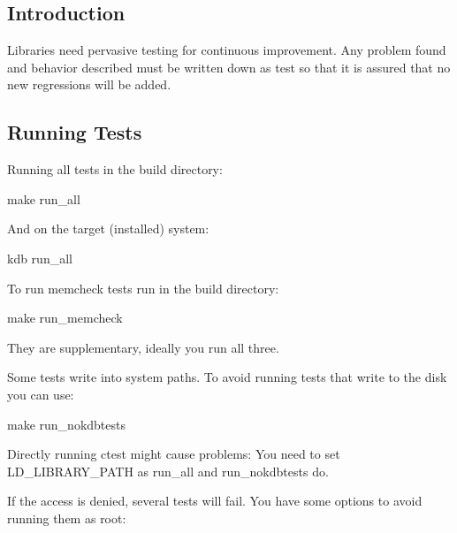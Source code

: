 \subsection*{Introduction}

Libraries need pervasive testing for continuous improvement. Any problem found and behavior described must be written down as test so that it is assured that no new regressions will be added.

\subsection*{Running Tests}

Running all tests in the build directory\+: \begin{DoxyVerb}make run_all
\end{DoxyVerb}


And on the target (installed) system\+: \begin{DoxyVerb}kdb run_all
\end{DoxyVerb}


To run {\ttfamily memcheck} tests run in the build directory\+: \begin{DoxyVerb}make run_memcheck
\end{DoxyVerb}


They are supplementary, ideally you run all three.

Some tests write into system paths. To avoid running tests that write to the disk you can use\+: \begin{DoxyVerb}make run_nokdbtests
\end{DoxyVerb}


Directly running {\ttfamily ctest} might cause problems\+: You need to set {\ttfamily L\+D\+\_\+\+L\+I\+B\+R\+A\+R\+Y\+\_\+\+P\+A\+TH} as {\ttfamily run\+\_\+all} and {\ttfamily run\+\_\+nokdbtests} do.

If the access is denied, several tests will fail. You have some options to avoid running them as root\+:



